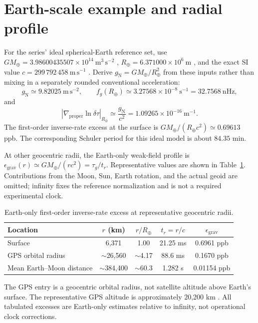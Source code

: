 \documentclass[12pt]{article}
\begin{document}
\section{Earth-scale example and radial profile}

For the series' ideal spherical-Earth reference set, use $GM_{\oplus}=3.98600435507\times10^{14}\ \mathrm{m^3\,s^{-2}}$ \cite{JPL}, $R_{\oplus}=6.371000\times10^6\ \mathrm{m}$ \cite{EarthFactSheet}, and the exact SI value $c=299\,792\,458\ \mathrm{m\,s^{-1}}$ \cite{BIPM}. Derive $g_{\mathrm{N}}=GM_{\oplus}/R_{\oplus}^2$ from these inputs rather than mixing in a separately rounded conventional acceleration:
\begin{equation}
  g_{\mathrm{N}}\simeq9.82025\ \mathrm{m\,s^{-2}},
  \qquad
  f_g(R_{\oplus})\simeq3.27568\times10^{-8}\ \mathrm{s^{-1}}
  =32.7568\ \mathrm{nHz},
  \label{eq:earth-fg}
\end{equation}
and
\begin{equation}
  \left|\nabla_{\mathrm{proper}}\ln\delta\tau\right|_{R_{\oplus}}
  \simeq\frac{g_{\mathrm{N}}}{c^2}
  =1.09265\times10^{-16}\ \mathrm{m^{-1}}.
  \label{eq:earth-slope}
\end{equation}
The first-order inverse-rate excess at the surface is $GM_{\oplus}/(R_{\oplus}c^2)\simeq0.69613$ ppb. The corresponding Schuler period for this ideal model is about $84.35$ min.

At other geocentric radii, the Earth-only weak-field profile is $\epsilon_{\mathrm{grav}}(r)\simeq GM_{\oplus}/(rc^2)=\tau_g/t_r$. Representative values are shown in Table~\ref{tab:radial-profile}. Contributions from the Moon, Sun, Earth rotation, and the actual geoid are omitted; infinity fixes the reference normalization and is not a required experimental clock.

\begin{table}[ht]
  \centering
  \caption{Earth-only first-order inverse-rate excess at representative geocentric radii.}
  \label{tab:radial-profile}
  \small
  \begin{tabular}{lcccc}
    \toprule
    Location & $r$ (km) & $r/R_{\oplus}$ & $t_r=r/c$ & $\epsilon_{\mathrm{grav}}$ \\
    \midrule
    Surface & 6,371 & 1.00 & 21.25 ms & 0.6961 ppb \\
    GPS orbital radius & $\sim$26,560 & $\sim$4.17 & 88.6 ms & 0.1670 ppb \\
    Mean Earth--Moon distance & $\sim$384,400 & $\sim$60.3 & 1.282 s & 0.01154 ppb \\
    \bottomrule
  \end{tabular}
\end{table}
The GPS entry is a geocentric orbital radius, not satellite altitude above Earth's surface. The representative GPS altitude is approximately 20,200 km \cite{GPS}. All tabulated excesses are Earth-only estimates relative to infinity, not operational clock corrections.
\end{document}
